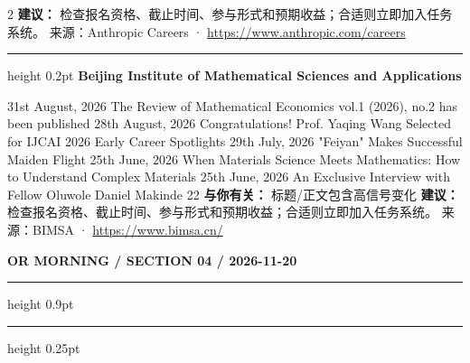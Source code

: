 \documentclass[10.5pt]{ctexart}
\begin{document}
\begin{multicols}{2}
\textbf{建议：} 检查报名资格、截止时间、参与形式和预期收益；合适则立即加入任务系统。
{\footnotesize\color{ormuted} 来源：Anthropic Careers · \url{https://www.anthropic.com/careers}}
\vspace{2mm}
\hrule height 0.2pt
\vspace{2mm}
{\large\bfseries Beijing Institute of Mathematical Sciences and Applications}\par
31st August, 2026 The Review of Mathematical Economics vol.1 (2026), no.2 has been published 28th August, 2026 Congratulations! Prof. Yaqing Wang Selected for IJCAI 2026 Early Career Spotlights 29th July, 2026 "Feiyan" Makes Successful Maiden Flight 25th June, 2026 When Materials Science Meets Mathematics: How to Understand Complex Materials 25th June, 2026 An Exclusive Interview with Fellow Oluwole Daniel Makinde 22
\textbf{与你有关：} 标题/正文包含高信号变化
\textbf{建议：} 检查报名资格、截止时间、参与形式和预期收益；合适则立即加入任务系统。
{\footnotesize\color{ormuted} 来源：BIMSA · \url{https://www.bimsa.cn/}}
\end{multicols}
\newpage
{\small\bfseries OR MORNING / SECTION 04 / 2026-11-20}
\vspace{2mm}
\hrule height 0.9pt
\vspace{1.5mm}
\hrule height 0.25pt
\vspace{4mm}
\end{document}
